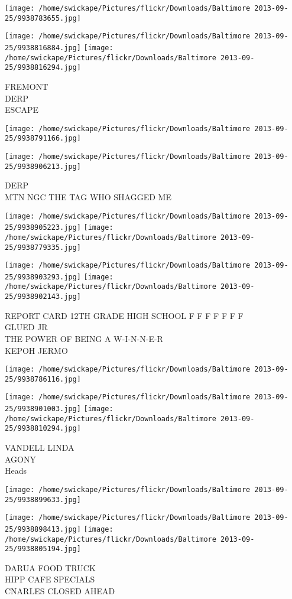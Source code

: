\documentclass[10pt,letterpaper]{article}
\begin{document}
\texttt{[image: /home/swickape/Pictures/flickr/Downloads/Baltimore 2013-09-25/9938783655.jpg]}

\vspace{0.25in}
\texttt{[image: /home/swickape/Pictures/flickr/Downloads/Baltimore 2013-09-25/9938816884.jpg]}
\texttt{[image: /home/swickape/Pictures/flickr/Downloads/Baltimore 2013-09-25/9938816294.jpg]}

FREMONT\\
DERP\\
ESCAPE
\pagebreak

\texttt{[image: /home/swickape/Pictures/flickr/Downloads/Baltimore 2013-09-25/9938791166.jpg]}

\vspace{0.25in}
\texttt{[image: /home/swickape/Pictures/flickr/Downloads/Baltimore 2013-09-25/9938906213.jpg]}

DERP\\
MTN NGC THE TAG WHO SHAGGED ME
\pagebreak

\texttt{[image: /home/swickape/Pictures/flickr/Downloads/Baltimore 2013-09-25/9938905223.jpg]}
\texttt{[image: /home/swickape/Pictures/flickr/Downloads/Baltimore 2013-09-25/9938779335.jpg]}

\texttt{[image: /home/swickape/Pictures/flickr/Downloads/Baltimore 2013-09-25/9938903293.jpg]}
\texttt{[image: /home/swickape/Pictures/flickr/Downloads/Baltimore 2013-09-25/9938902143.jpg]}

REPORT CARD 12TH GRADE HIGH SCHOOL F F F F F F F\\
GLUED JR\\
THE POWER OF BEING A W{-}I{-}N{-}N{-}E{-}R\\
KEPOH JERMO
\pagebreak

\texttt{[image: /home/swickape/Pictures/flickr/Downloads/Baltimore 2013-09-25/9938786116.jpg]}

\vspace{0.25in}
\texttt{[image: /home/swickape/Pictures/flickr/Downloads/Baltimore 2013-09-25/9938901003.jpg]}
\texttt{[image: /home/swickape/Pictures/flickr/Downloads/Baltimore 2013-09-25/9938810294.jpg]}

VANDELL LINDA\\
AGONY\\
Heads
\pagebreak

\texttt{[image: /home/swickape/Pictures/flickr/Downloads/Baltimore 2013-09-25/9938899633.jpg]}

\vspace{0.25in}
\texttt{[image: /home/swickape/Pictures/flickr/Downloads/Baltimore 2013-09-25/9938898413.jpg]}
\texttt{[image: /home/swickape/Pictures/flickr/Downloads/Baltimore 2013-09-25/9938805194.jpg]}

DARUA FOOD TRUCK\\
HIPP CAFE SPECIALS\\
CNARLES CLOSED AHEAD
\pagebreak
\end{document}
